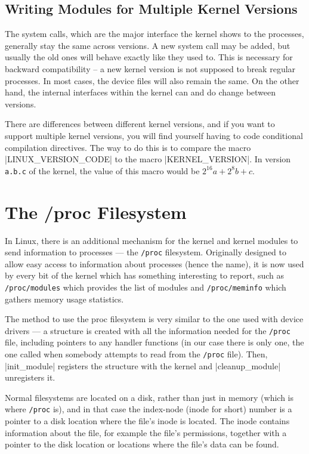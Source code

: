 \documentclass[10pt, oneside]{book}
\begin{document}

\subsection{Writing Modules for Multiple Kernel Versions}
\label{sec:modules_for_versions}
The system calls, which are the major interface the kernel shows to the processes, generally stay the same across versions.
A new system call may be added, but usually the old ones will behave exactly like they used to.
This is necessary for backward compatibility -- a new kernel version is not supposed to break regular processes.
In most cases, the device files will also remain the same. On the other hand, the internal interfaces within the kernel can and do change between versions.

There are differences between different kernel versions, and if you want to support multiple kernel versions, you will find yourself having to code conditional compilation directives.
The way to do this is to compare the macro \cpp|LINUX_VERSION_CODE| to the macro \cpp|KERNEL_VERSION|.
In version \verb|a.b.c| of the kernel, the value of this macro would be \(2^{16}a+2^{8}b+c\).

\section{The /proc Filesystem}
\label{sec:procfs}
In Linux, there is an additional mechanism for the kernel and kernel modules to send information to processes --- the \verb|/proc| filesystem.
Originally designed to allow easy access to information about processes (hence the name), it is now used by every bit of the kernel which has something interesting to report, such as \verb|/proc/modules| which provides the list of modules and \verb|/proc/meminfo| which gathers memory usage statistics.

The method to use the proc filesystem is very similar to the one used with device drivers --- a structure is created with all the information needed for the \verb|/proc| file, including pointers to any handler functions (in our case there is only one, the one called when somebody attempts to read from the \verb|/proc| file).
Then, \cpp|init_module| registers the structure with the kernel and \cpp|cleanup_module| unregisters it.

Normal filesystems are located on a disk, rather than just in memory (which is where \verb|/proc| is), and in that case the index-node (inode for short) number is a pointer to a disk location where the file's inode is located.
The inode contains information about the file, for example the file's permissions, together with a pointer to the disk location or locations where the file's data can be found.
\end{document}

